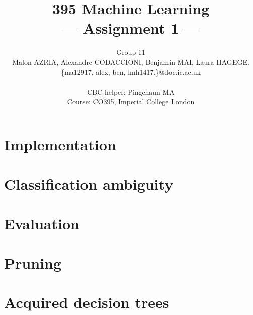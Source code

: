 \documentclass[a4paper,11pt]{article}
\title{395 Machine Learning\\\Large{--- Assignment 1 ---}}
\author{Group 11\\Malon AZRIA, Alexandre CODACCIONI, Benjamin MAI, Laura HAGEGE.\\
       \{ma12917, alex, ben, lmh1417.\}@doc.ic.ac.uk\\ \\
       \small{CBC helper: Pingchaun MA}\\
       \small{Course: CO395, Imperial College London}
}
\begin{document}
\maketitle

\section{Implementation}
    

\section{Classification ambiguity}
    

\section{Evaluation}
    

\section{Pruning}
    

\newpage
\section{Acquired decision trees}
    
\end{document}
